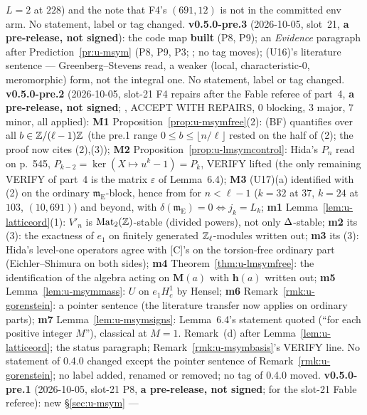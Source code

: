 \documentclass[11pt]{article}
\newcommand{\VERIFYloc}{\textsf{VERIFY}}          %
\newcommand{\hcusp}{\mathbf{h}}                   %
\newcommand{\Pk}[1]{P_{#1}}                       %
\newcommand{\Eis}{\mathrm{E}}
\newcommand{\Zl}{\Z_\ell}
\begin{document}
$L=2$ at $228$) and the note that F4's $(691,12)$ is not in the committed env arm. No statement, label or tag changed. \textbf{v0.5.0-pre.3} (2026-10-05, slot~21, \textbf{a pre-release, not signed}): the code map \textbf{built} (P8, P9); an \emph{Evidence} paragraph
after Prediction~\ref{pr:u-msym} (P8, P9, P3; \COMP; no tag moves); (U16)'s literature sentence --- Greenberg--Stevens read, a weaker (local, characteristic-$0$, meromorphic) form,
not the integral one. No statement, label or tag changed. \textbf{v0.5.0-pre.2} (2026-10-05, slot-21 F4 repairs after the Fable referee of part~4, \textbf{a pre-release, not signed};
, ACCEPT WITH REPAIRS, $0$ blocking, $3$ major, $7$ minor, all applied): \textbf{M1} Proposition~\ref{prop:u-msymfree}(2): (BF)
quantifies over all $b\in\mathbb{Z}/(\ell-1)\mathbb{Z}$ (the pre.1 range $0\le b\le\lfloor n/\ell\rfloor$ rested on the \CONJ{} half of (2); the proof now cites (2),(3)); \textbf{M2}
Proposition~\ref{prop:u-lmsymcontrol}: Hida's $P_n$ read on p.~545, $P_{k-2}=\ker(X\mapsto u^{k}-1)=\Pk{k}$, \VERIFYloc{} lifted (the only remaining \VERIFYloc{} of part~4 is the matrix $\varepsilon$ of
Lemma~6.4); \textbf{M3} (U17)(a) identified with (2) on the ordinary $\mathfrak m_\Eis$-block, hence \PROVED{} from \STD{} for $n<\ell-1$ ($k=32$ at $37$, $k=24$ at $103$,
$(10,691)$) and \CONJ{} beyond, with $\delta(\mathfrak m_\Eis)=0\iff j_k=L_k$; \textbf{m1} Lemma~\ref{lem:u-latticeord}(1): $V'_n$ is $\mathrm{Mat}_2(\mathbb{Z})$-stable (divided powers), not only
$\Delta$-stable; \textbf{m2} its (3): the exactness of $e_1$ on finitely generated $\Zl$-modules written out; \textbf{m3} its (3): Hida's level-one operators agree with [C]'s on the
torsion-free ordinary part (Eichler--Shimura on both sides); \textbf{m4} Theorem~\ref{thm:u-lmsymfree}: the identification of the algebra acting on $\mathbf M(a)$ with $\hcusp(a)$ written out;
\textbf{m5} Lemma~\ref{lem:u-msymmass}: $U$ on $e_1H^{1}_c$ by Hensel; \textbf{m6} Remark~\ref{rmk:u-gorenstein}: a pointer sentence (the literature transfer now applies on ordinary parts);
\textbf{m7} Lemma~\ref{lem:u-msymsigns}: Lemma~6.4's statement quoted (``for each positive integer $M$''), classical at $M=1$. Remark~(d) after Lemma~\ref{lem:u-latticeord}; the status
paragraph; Remark~\ref{rmk:u-msymbasis}'s \VERIFYloc{} line. No statement of 0.4.0 changed except the pointer sentence of Remark~\ref{rmk:u-gorenstein}; no label added, renamed or removed; no tag of 0.4.0 moved.
\textbf{v0.5.0-pre.1} (2026-10-05, slot-21 P8, \textbf{a pre-release, not signed}; for the slot-21 Fable referee): new \S\ref{sec:u-msym} ---
\end{document}
